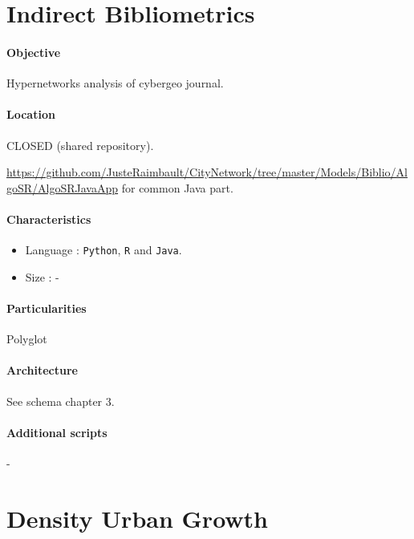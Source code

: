\section{Indirect Bibliometrics}

\paragraph{Objective}

Hypernetworks analysis of cybergeo journal.

\paragraph{Location}

CLOSED (shared repository).

\url{https://github.com/JusteRaimbault/CityNetwork/tree/master/Models/Biblio/AlgoSR/AlgoSRJavaApp} for common Java part.

\paragraph{Characteristics}

\begin{itemize}
\item Language : \texttt{Python}, \texttt{R} and \texttt{Java}.
\item Size : -
\end{itemize}


\paragraph{Particularities}

Polyglot 

\paragraph{Architecture}

See schema chapter 3.

\paragraph{Additional scripts}

-





\section{Density Urban Growth}

